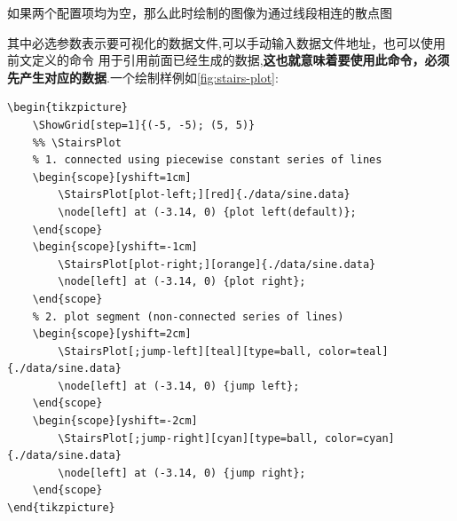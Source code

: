 \begin{remark}
    如果两个配置项均为空，那么此时绘制的图像为通过线段相连的散点图
\end{remark}

其中必选参数表示要可视化的数据文件,可以手动输入数据文件地址，也可以使用前文定义的命令
用于引用前面已经生成的数据,\textbf{这也就意味着要使用此命令，必须先产生对应的数据}.一个绘制样例如\cref{fig:stairs-plot}:

\begin{verbatim}
\begin{tikzpicture}
    \ShowGrid[step=1]{(-5, -5); (5, 5)}
    %% \StairsPlot
    % 1. connected using piecewise constant series of lines
    \begin{scope}[yshift=1cm]
        \StairsPlot[plot-left;][red]{./data/sine.data}
        \node[left] at (-3.14, 0) {plot left(default)};
    \end{scope}
    \begin{scope}[yshift=-1cm]
        \StairsPlot[plot-right;][orange]{./data/sine.data}
        \node[left] at (-3.14, 0) {plot right};
    \end{scope}
    % 2. plot segment (non-connected series of lines)      
    \begin{scope}[yshift=2cm]
        \StairsPlot[;jump-left][teal][type=ball, color=teal]{./data/sine.data}
        \node[left] at (-3.14, 0) {jump left};
    \end{scope}
    \begin{scope}[yshift=-2cm]
        \StairsPlot[;jump-right][cyan][type=ball, color=cyan]{./data/sine.data}
        \node[left] at (-3.14, 0) {jump right};
    \end{scope}
\end{tikzpicture}
\end{verbatim}

